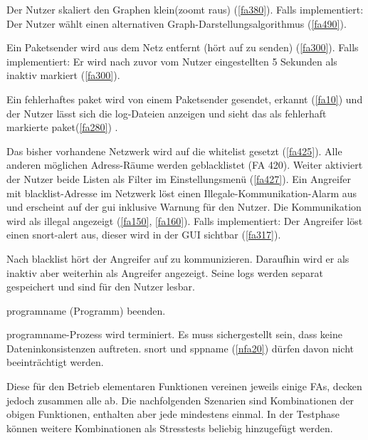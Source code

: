 \begin{description}[style=multiline, leftmargin=4cm, labelwidth=4cm]
   Der Nutzer skaliert den Graphen klein(zoomt raus) (\ref{fa380}). Falls implementiert: Der Nutzer wählt einen alternativen Graph-Darstellungsalgorithmus (\ref{fa490}).

   Ein Paketsender wird aus dem Netz entfernt (hört auf zu senden) (\ref{fa300}). Falls implementiert: Er wird nach zuvor vom Nutzer eingestellten 5 Sekunden als inaktiv markiert (\ref{fa300}).

   Ein fehlerhaftes \gls{paket} wird von einem Paketsender gesendet, erkannt (\ref{fa10}) und der Nutzer lässt sich die \gls{log}-Dateien anzeigen und sieht das als fehlerhaft markierte \gls{paket}(\ref{fa280}) .

   Das bisher vorhandene Netzwerk wird auf die \gls{whitelist} gesetzt (\ref{fa425}). Alle anderen möglichen Adress-Räume werden geblacklistet (FA 420). Weiter aktiviert der Nutzer beide Listen als Filter im Einstellungsmenü (\ref{fa427}). Ein Angreifer mit \gls{blacklist}-Adresse im Netzwerk löst einen Illegale-Kommunikation-Alarm aus und erscheint auf der \gls{gui} inklusive Warnung für den Nutzer. Die Kommunikation wird als illegal angezeigt (\ref{fa150}, \ref{fa160}). Falls implementiert: Der Angreifer löst einen \gls{snort}-\gls{alert} aus, dieser wird in der GUI sichtbar (\ref{fa317}).

   Nach \gls{blacklist} hört der Angreifer auf zu kommunizieren. Daraufhin wird er als inaktiv aber weiterhin als Angreifer angezeigt. Seine \glspl{log} werden separat gespeichert und sind für den Nutzer lesbar.

   \gls{programname} (Programm) beenden.

   \gls{programname}-Prozess wird terminiert. Es muss sichergestellt sein, dass keine Dateninkonsistenzen auftreten. \gls{snort} und \gls{sppname} (\ref{nfa20}) dürfen davon nicht beeinträchtigt werden.

\end{description}

\par
Diese für den Betrieb elementaren Funktionen vereinen jeweils einige FAs, decken jedoch zusammen alle ab. Die nachfolgenden Szenarien sind Kombinationen der obigen Funktionen, enthalten aber jede mindestens einmal. In der Testphase können weitere Kombinationen als Stresstests beliebig hinzugefügt werden.

